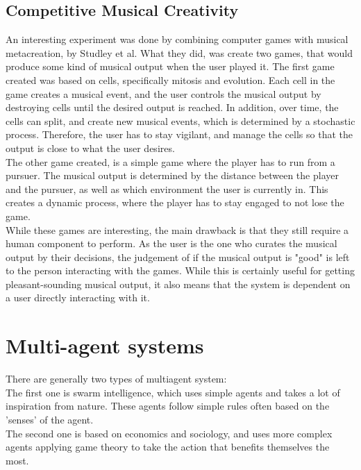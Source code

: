 \documentclass[a4paper,english]{report}
\begin{document}
	\subsection{Competitive Musical Creativity}
	An interesting experiment was done by combining computer games with musical metacreation, by Studley et al. \cite{studley2019exploring} What they did, was create two games, that would produce some kind of musical output when the user played it. The first game created was based on cells, specifically mitosis and evolution. Each cell in the game creates a musical event, and the user controls the musical output by destroying cells until the desired output is reached. In addition, over time, the cells can split, and create new musical events, which is determined by a stochastic process. Therefore, the user has to stay vigilant, and manage the cells so that the output is close to what the user desires.\\
	The other game created, is a simple game where the player has to run from a pursuer. The musical output is determined by the distance between the player and the pursuer, as well as which environment the user is currently in. This creates a dynamic process, where the player has to stay engaged to not lose the game.\\
	While these games are interesting, the main drawback is that they still require a human component to perform. As the user is the one who curates the musical output by their decisions, the judgement of if the musical output is "good" is left to the person interacting with the games. While this is certainly useful for getting pleasant-sounding musical output, it also means that the system is dependent on a user directly interacting with it.
	\fi
	
	\section{Multi-agent systems}
	There are generally two types of multiagent system: \\
	The first one is swarm intelligence, which uses simple agents and takes a lot of inspiration from nature. These agents follow simple rules often based on the 'senses' of the agent. \\
	The second one is based on economics and sociology, and uses more complex agents applying game theory to take the action that benefits themselves the most. 
	
\end{document}
